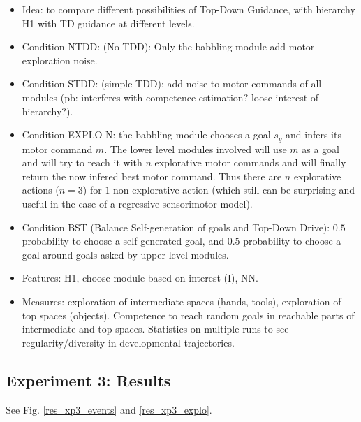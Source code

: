 \documentclass[conference]{include/IEEEtran}
\begin{document}
		\begin{itemize}
			\item Idea: to compare different possibilities of Top-Down Guidance, with hierarchy H1 with TD guidance at different levels.
			
			\item Condition NTDD: (No TDD): Only the babbling module add motor exploration noise.
			
			\item Condition STDD: (simple TDD): add noise to motor commands of all modules (pb: interferes with competence estimation? loose interest of hierarchy?).
			
			\item Condition EXPLO-N: the babbling module chooses a goal $s_g$ and infers its motor command $m$. 
					The lower level modules involved will use $m$ as a goal and will try to reach it with $n$ explorative motor commands and will finally return the now infered best motor command.
					Thus there are $n$ explorative actions ($n=3$) for $1$ non explorative action (which still can be surprising and useful in the case of a regressive sensorimotor model).
			
			\item Condition BST (Balance Self-generation of goals and Top-Down Drive): $0.5$ probability to choose a self-generated goal, and $0.5$ probability to choose a goal around goals asked by upper-level modules.
			
			\item Features: H1, choose module based on interest (I), NN.
			
			\item Measures: exploration of intermediate spaces (hands, tools), exploration of top spaces (objects). Competence to reach random goals in reachable parts of intermediate and top spaces. 
					Statistics on multiple runs to see regularity/diversity in developmental trajectories.
		\end{itemize}
		
		
	\subsection{Experiment 3: Results}
	
		See Fig. \ref{res_xp3_events} and \ref{res_xp3_explo}.
		
		
\end{document}
